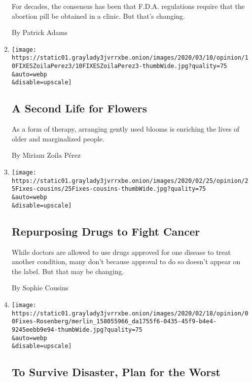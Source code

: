 \begin{enumerate}
  For decades, the consensus has been that F.D.A. regulations require
  that the abortion pill be obtained in a clinic. But that's changing.

  By Patrick Adams
\item
  \href{/2020/03/10/opinion/second-life-flowers.html}{}

  \texttt{[image: https://static01.graylady3jvrrxbe.onion/images/2020/03/10/opinion/10FIXESZoilaPerez3/10FIXESZoilaPerez3-thumbWide.jpg?quality=75\\\&auto=webp\\\&disable=upscale]}

  \hypertarget{a-second-life-for-flowers}{%
  \subsection{A Second Life for
  Flowers}\label{a-second-life-for-flowers}}

  As a form of therapy, arranging gently used blooms is enriching the
  lives of older and marginalized people.

  By Miriam Zoila Pérez
\item
  \href{/2020/02/25/opinion/repurposing-drugs-cancer.html}{}

  \texttt{[image: https://static01.graylady3jvrrxbe.onion/images/2020/02/25/opinion/25Fixes-cousins/25Fixes-cousins-thumbWide.jpg?quality=75\\\&auto=webp\\\&disable=upscale]}

  \hypertarget{repurposing-drugs-to-fight-cancer}{%
  \subsection{Repurposing Drugs to Fight
  Cancer}\label{repurposing-drugs-to-fight-cancer}}

  While doctors are allowed to use drugs approved for one disease to
  treat another condition, many don't because approval to do so doesn't
  appear on the label. But that may be changing.

  By Sophie Cousins
\item
  \href{/2020/02/19/opinion/survive-disaster-plan-for-worst.html}{}

  \texttt{[image: https://static01.graylady3jvrrxbe.onion/images/2020/02/18/opinion/00Fixes-Rosenberg/merlin\_158055966\_da1755f6-0435-45f9-b4e4-9245eebb9e94-thumbWide.jpg?quality=75\\\&auto=webp\\\&disable=upscale]}

  \hypertarget{to-survive-disaster-plan-for-the-worst}{%
  \subsection{To Survive Disaster, Plan for the
  Worst}\label{to-survive-disaster-plan-for-the-worst}}


\end{enumerate}

